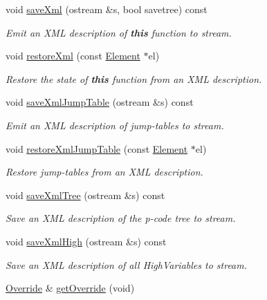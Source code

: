 \begin{DoxyCompactItemize}
void \mbox{\hyperlink{class_funcdata_a7d1d8baaefe519897b72e8537f0cb335}{save\+Xml}} (ostream \&s, bool savetree) const
\begin{DoxyCompactList}\small\item\em Emit an X\+ML description of {\bfseries{this}} function to stream. \end{DoxyCompactList}\item 
void \mbox{\hyperlink{class_funcdata_a40da83020eebf723001109c64407cef4}{restore\+Xml}} (const \mbox{\hyperlink{class_element}{Element}} $\ast$el)
\begin{DoxyCompactList}\small\item\em Restore the state of {\bfseries{this}} function from an X\+ML description. \end{DoxyCompactList}\item 
void \mbox{\hyperlink{class_funcdata_a5f2d5d66f0ae7c5c4eae20d60ad30897}{save\+Xml\+Jump\+Table}} (ostream \&s) const
\begin{DoxyCompactList}\small\item\em Emit an X\+ML description of jump-\/tables to stream. \end{DoxyCompactList}\item 
void \mbox{\hyperlink{class_funcdata_a07a41bb91dd51c9a76d8f6d1e2f09328}{restore\+Xml\+Jump\+Table}} (const \mbox{\hyperlink{class_element}{Element}} $\ast$el)
\begin{DoxyCompactList}\small\item\em Restore jump-\/tables from an X\+ML description. \end{DoxyCompactList}\item 
void \mbox{\hyperlink{class_funcdata_a7630153130424a56fac5a4b4a4792b60}{save\+Xml\+Tree}} (ostream \&s) const
\begin{DoxyCompactList}\small\item\em Save an X\+ML description of the p-\/code tree to stream. \end{DoxyCompactList}\item 
void \mbox{\hyperlink{class_funcdata_accde64f2642f6e86545df826e2751f8b}{save\+Xml\+High}} (ostream \&s) const
\begin{DoxyCompactList}\small\item\em Save an X\+ML description of all High\+Variables to stream. \end{DoxyCompactList}\item 
\mbox{\hyperlink{class_override}{Override}} \& \mbox{\hyperlink{class_funcdata_ac48d087ed5fbf901cfa608d8f44b6d5c}{get\+Override}} (void)

\end{DoxyCompactItemize}
